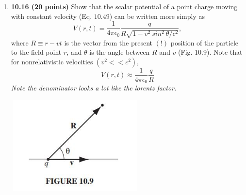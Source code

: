 \documentclass[fleqn]{article}
\begin{document}
\begin{enumerate}
    \item \textbf{10.16 (20 points)} Show that the scalar potential of a point charge moving with constant 
    velocity (Eq. $10.49$) can be written more simply as
    $$
      V(r,t)=\dfrac{1}{4 \pi \epsilon_0} \dfrac{q}{R\sqrt{1-v^2 ~ sin^2 ~ \theta/c^2}},
    $$
    where $R \equiv r-vt$ is the vector from the present $(!)$ position of the particle to the
    field point $r$, and $\theta$ is the angle between $R$ and $v$ (Fig. 10.9). Note that 
    for nonrelativistic velocities $(v^2 << c^2)$,
    $$
      V(r,t) \approx \dfrac{1}{4 \pi \epsilon_0} \dfrac{q}{R}
    $$
    \emph{Note the denominator looks a lot like the lorentz factor.}
    \begin{center}
      \includegraphics[height=5cm, width=7cm]{1.JPG}
    \end{center}


\end{enumerate}
\end{document}
